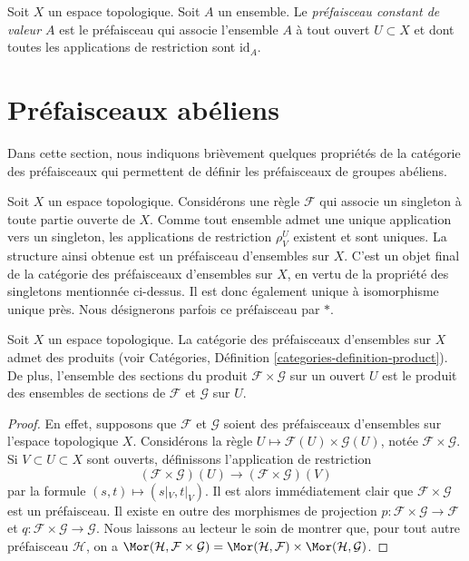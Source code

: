 \begin{definition}
\label{definition-constant-presheaf}
Soit $X$ un espace topologique. Soit $A$ un ensemble.
Le {\it préfaisceau constant de valeur $A$} est le
préfaisceau qui associe l'ensemble $A$ à tout ouvert
$U \subset X$ et dont toutes les applications de restriction
sont $\text{id}_A$.
\end{definition}

\section{Préfaisceaux abéliens}
\label{section-abelian-presheaves}

\noindent
Dans cette section, nous indiquons brièvement quelques propriétés de la
catégorie des préfaisceaux qui permettent de définir les préfaisceaux
de groupes abéliens.

\begin{example}
\label{example-singleton-presheaf}
Soit $X$ un espace topologique. Considérons une règle $\mathcal{F}$ qui
associe un singleton à toute partie ouverte de $X$. Comme tout ensemble admet
une unique application vers un singleton, les applications de restriction
$\rho^U_V$ existent et sont uniques. La structure ainsi obtenue est un
préfaisceau d'ensembles sur $X$. C'est un objet final de la catégorie des
préfaisceaux d'ensembles sur $X$, en vertu de la propriété des singletons
mentionnée ci-dessus. Il est donc
également unique à isomorphisme unique près. Nous désignerons parfois ce
préfaisceau par $*$.
\end{example}

\begin{lemma}
\label{lemma-product-presheaves}
Soit $X$ un espace topologique. La catégorie des préfaisceaux d'ensembles
sur $X$ admet des produits (voir
Catégories, Définition \ref{categories-definition-product}).
De plus, l'ensemble des
sections du produit $\mathcal{F} \times \mathcal{G}$
sur un ouvert $U$ est le produit des ensembles de sections de
$\mathcal{F}$ et $\mathcal{G}$ sur $U$.
\end{lemma}

\begin{proof}
En effet, supposons que $\mathcal{F}$ et $\mathcal{G}$ soient des
préfaisceaux d'ensembles sur l'espace topologique $X$.
Considérons la règle $U \mapsto \mathcal{F}(U) \times \mathcal{G}(U)$,
notée $\mathcal{F} \times \mathcal{G}$. Si $V \subset U \subset X$
sont ouverts, définissons l'application de restriction
$$
(\mathcal{F} \times \mathcal{G})(U)
\longrightarrow
(\mathcal{F} \times \mathcal{G})(V)
$$
par la formule $(s, t) \mapsto (s|_V, t|_V)$. Il est alors immédiatement
clair que $\mathcal{F} \times \mathcal{G}$ est un préfaisceau.
Il existe en outre des morphismes de projection
$p : \mathcal{F} \times \mathcal{G} \to \mathcal{F}$
et
$q : \mathcal{F} \times \mathcal{G} \to \mathcal{G}$.
Nous laissons au lecteur le soin de montrer que,
pour tout autre préfaisceau $\mathcal{H}$, on a
$\Mor(\mathcal{H}, \mathcal{F} \times \mathcal{G})
= \Mor(\mathcal{H}, \mathcal{F}) \times
\Mor(\mathcal{H}, \mathcal{G})$.
\end{proof}

